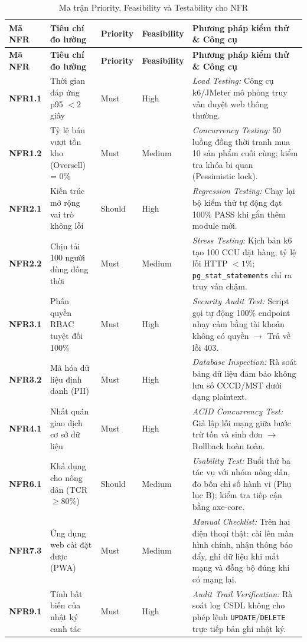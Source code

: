 \begingroup
\tblsetup\tblzebra
\begin{longtable}{L{1.52cm} L{4.20cm} >{\centering\arraybackslash}p{1.65cm} >{\centering\arraybackslash}p{2.00cm} L{4.82cm}}
\caption{Ma trận Priority, Feasibility và Testability cho NFR}
\label{tab:nfr-matrix} \\
\toprule
{}
\textbf{Mã NFR} & \textbf{Tiêu chí đo lường} & \textbf{Priority} & \textbf{Feasibility} & \textbf{Phương pháp kiểm thử \& Công cụ} \\
\midrule
\endfirsthead
\toprule
{}
\textbf{Mã NFR} & \textbf{Tiêu chí đo lường} & \textbf{Priority} & \textbf{Feasibility} & \textbf{Phương pháp kiểm thử \& Công cụ} \\
\midrule
\endhead
\bottomrule
\endfoot
\textbf{NFR1.1} & Thời gian đáp ứng p95 $< 2$ giây & Must & High & \textit{Load Testing:} Công cụ k6/JMeter mô phỏng truy vấn duyệt web thông thường. \\
\textbf{NFR1.2} & Tỷ lệ bán vượt tồn kho (Oversell) = 0\% & Must & Medium & \textit{Concurrency Testing:} 50 luồng đồng thời tranh mua 10 sản phẩm cuối cùng; kiểm tra khóa bi quan (Pessimistic lock). \\
\textbf{NFR2.1} & Kiến trúc mở rộng vai trò không lỗi & Should & High & \textit{Regression Testing:} Chạy lại bộ kiểm thử tự động đạt 100\% PASS khi gắn thêm module mới. \\
\textbf{NFR2.2} & Chịu tải 100 người dùng đồng thời & Must & Medium & \textit{Stress Testing:} Kịch bản k6 tạo 100 CCU đặt hàng; tỷ lệ lỗi HTTP $< 1\%$; \texttt{pg\_stat\_statements} chỉ ra truy vấn chậm. \\
\textbf{NFR3.1} & Phân quyền RBAC tuyệt đối 100\% & Must & High & \textit{Security Audit Test:} Script gọi tự động 100\% endpoint nhạy cảm bằng tài khoản không có quyền $\rightarrow$ Trả về lỗi 403. \\
\textbf{NFR3.2} & Mã hóa dữ liệu định danh (PII) & Must & High & \textit{Database Inspection:} Rà soát bảng dữ liệu đảm bảo không lưu số CCCD/MST dưới dạng plaintext. \\
\textbf{NFR4.1} & Nhất quán giao dịch cơ sở dữ liệu & Must & High & \textit{ACID Concurrency Test:} Giả lập lỗi mạng giữa bước trừ tồn và sinh đơn $\rightarrow$ Rollback hoàn toàn. \\
\textbf{NFR6.1} & Khả dụng cho nông dân (TCR $\ge 80\%$) & Should & Medium & \textit{Usability Test:} Buổi thử ba tác vụ với nhóm nông dân, đo bốn chỉ số hành vi (Phụ lục B); kiểm tra tiếp cận bằng axe-core. \\
\textbf{NFR7.3} & Ứng dụng web cài đặt được (PWA) & Must & Medium & \textit{Manual Checklist:} Trên hai điện thoại thật: cài lên màn hình chính, nhận thông báo đẩy, ghi dữ liệu khi mất mạng và đồng bộ đúng khi có mạng lại. \\
\textbf{NFR9.1} & Tính bất biến của nhật ký canh tác & Must & High & \textit{Audit Trail Verification:} Rà soát log CSDL không cho phép lệnh \texttt{UPDATE}/\texttt{DELETE} trực tiếp bản ghi nhật ký. \\
\end{longtable}
\endgroup
